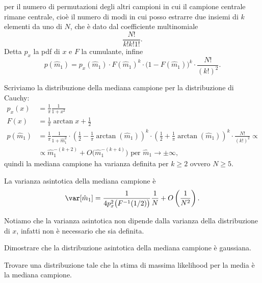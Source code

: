 per il numero di permutazioni degli altri campioni in cui il campione centrale rimane centrale,
cioè il numero di modi in cui posso estrarre due insiemi di $k$ elementi da uno di $N$,
che è dato dal coefficiente multinomiale
\begin{equation*}
	\frac{N!}{k!k!1!}.
\end{equation*}
Detta $p_x$ la pdf di $x$ e $F$ la cumulante, infine
\begin{equation*}
	p(\hat m_1)
	= p_x(\hat m_1)
	\cdot F(\hat m_1)^k
	\cdot \big(1-F(\hat m_1)\big)^k
	\cdot \frac{N!}{(k!)^2}.
\end{equation*}
\begin{example}
	Scriviamo la distribuzione della mediana campione per la distribuzione di Cauchy:
	\begin{align*}
		p_x(x)
		&= \frac1\pi \frac1{1+x^2} \\
		F(x)
		&= \frac1\pi\arctan x + \frac12 \\
		p(\hat m_1)
		&= \frac 1\pi \frac1{1+\hat m_1^2}
		\cdot \left(\frac12 - \frac1\pi\arctan(\hat m_1)\right)^k
		\cdot \left(\frac12 + \frac1\pi\arctan(\hat m_1)\right)^k
		\cdot \frac{N!}{(k!)^2} \propto \\
		&\propto \hat m_1^{-(k+2)} + O\big(\hat m_1^{-(k+4)}\big) \text{ per $\hat m_1\to\pm\infty$},
	\end{align*}
	quindi la mediana campione ha varianza definita per $k\ge2$ ovvero $N\ge5$.
\end{example}

\begin{fact}
	La varianza asintotica della mediana campione è
	\begin{equation*}
		\var[\hat m_1]
		= \frac1{4p_x^2\big(F^{-1}(1/2)\big)}\frac1N + O\left(\frac1{N^2}\right).
	\end{equation*}
\end{fact}
Notiamo che la varianza asintotica non dipende dalla varianza della distribuzione di $x$,
infatti non è necessario che sia definita.
\begin{exercise}
	Dimostrare che la distribuzione asintotica della mediana campione è gaussiana.
\end{exercise}

\begin{exercise}
	Trovare una distribuzione tale che la stima di massima likelihood per la media è la mediana campione.
\end{exercise}

